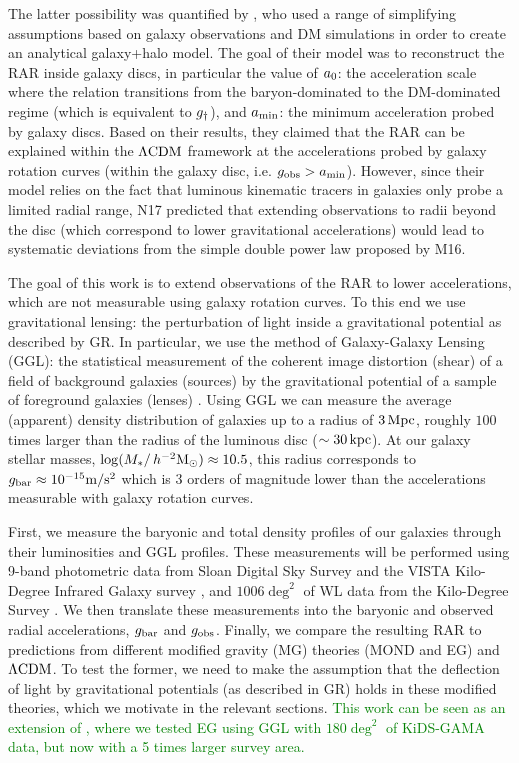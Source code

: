 \documentclass[usenatbib]{mnras}
\newcommand{\hmsun}{\,h^{-2} {\rm M_\odot}}
\newcommand{\mpss}{ {\rm m/s^2} }
\newcommand{\lcdm}{{\rm \Lambda CDM}}
\newcommand{\un}[1]{_{\rm #1}}
\begin{document}
The latter possibility was quantified by \citet[][hereafter N17]{navarro2017}, who used a range of simplifying assumptions based on galaxy observations and DM simulations in order to create an analytical galaxy+halo model. The goal of their model was to reconstruct the RAR inside galaxy discs, in particular the value of $a\un{0}$: the acceleration scale where the relation transitions from the baryon-dominated to the DM-dominated regime (which is equivalent to $g\un{\dagger}$), and $a\un{min}$: the minimum acceleration probed by galaxy discs. Based on their results, they claimed that the RAR can be explained within the $\lcdm$ framework at the accelerations probed by galaxy rotation curves (within the galaxy disc, i.e. $g\un{obs}>a\un{min}$). However, since their model relies on the fact that luminous kinematic tracers in galaxies only probe a limited radial range, N17 predicted that extending observations to radii beyond the disc (which correspond to lower gravitational accelerations) would lead to systematic deviations from the simple double power law proposed by M16.

The goal of this work is to extend observations of the RAR to lower accelerations, which are not measurable using galaxy rotation curves. To this end we use gravitational lensing: the perturbation of light inside a gravitational potential as described by GR. In particular, we use the method of Galaxy-Galaxy Lensing (GGL): the statistical measurement of the coherent image distortion (shear) of a field of background galaxies (sources) by the gravitational potential of a sample of foreground galaxies (lenses) \cite[for examples, see e.g.][]{fischer2000ggl,hoekstra2004,mandelbaum2006,uitert2016}. Using GGL we can measure the average (apparent) density distribution of galaxies up to a radius of $3\,{\rm Mpc}$, roughly $100$ times larger than the radius of the luminous disc ($\sim 30\,{\rm kpc}$). At our galaxy stellar masses, $\log(M_*/\hmsun) \approx 10.5$, this radius corresponds to $g\un{bar}\approx10^{-15} \mpss$ which is $3$ orders of magnitude lower than the accelerations measurable with galaxy rotation curves.

First, we measure the baryonic and total density profiles of our galaxies through their luminosities and GGL profiles. These measurements will be performed using 9-band photometric data from Sloan Digital Sky Survey \cite[SDSS,]{abazajian2009} and the VISTA Kilo-Degree Infrared Galaxy survey \cite[VIKING]{edge2013}, and $1006 \deg^2$ of WL data from the Kilo-Degree Survey \textcolor{Green}{\cite[KiDS-1000;][]{dejong2013,kuijken2019}}. We then translate these measurements into the baryonic and observed radial accelerations, $g\un{bar}$ and $g\un{obs}$. Finally, we compare the resulting RAR to predictions from different modified gravity (MG) theories (MOND and EG) and $\lcdm$. To test the former, we need to make the assumption that the deflection of light by gravitational potentials (as described in GR) holds in these modified theories, which we motivate in the relevant sections. \textcolor{Green}{This work can be seen as an extension of \cite{brouwer2017}, where we tested EG using GGL with $180 \deg^2$ of KiDS-GAMA data, but now with a 5 times larger survey area.}
\end{document}
